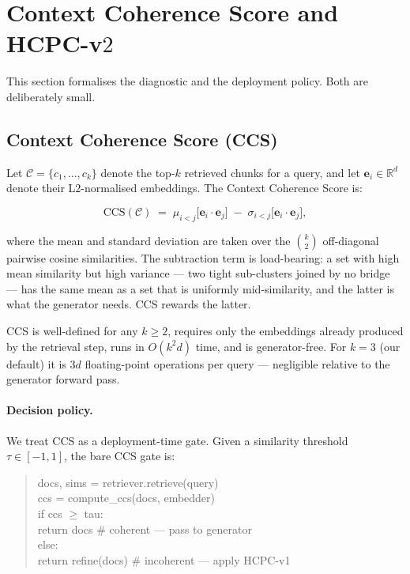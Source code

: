 \section{Context Coherence Score and HCPC-v$2$}
\label{sec:method}

This section formalises the diagnostic and the deployment policy.
Both are deliberately small.

\subsection{Context Coherence Score (CCS)}
\label{sec:method:ccs}

Let $\mathcal{C} = \{c_1, \ldots, c_k\}$ denote the top-$k$ retrieved
chunks for a query, and let $\mathbf{e}_i \in \mathbb{R}^d$ denote
their L$2$-normalised embeddings. The Context Coherence Score is:

\begin{equation}
\textrm{CCS}(\mathcal{C}) \;=\;
  \mu_{i<j}\!\bigl[\mathbf{e}_i \cdot \mathbf{e}_j\bigr]
  \;-\;
  \sigma_{i<j}\!\bigl[\mathbf{e}_i \cdot \mathbf{e}_j\bigr],
\end{equation}

where the mean and standard deviation are taken over the $\binom{k}{2}$
off-diagonal pairwise cosine similarities. The subtraction term is
load-bearing: a set with high mean similarity but high variance --- two
tight sub-clusters joined by no bridge --- has the same mean as a set
that is uniformly mid-similarity, and the latter is what the generator
needs. CCS rewards the latter.

CCS is well-defined for any $k \geq 2$, requires only the embeddings
already produced by the retrieval step, runs in $O(k^2 d)$ time,
and is generator-free. For $k = 3$ (our default) it is $3 d$
floating-point operations per query --- negligible relative to the
generator forward pass.

\paragraph{Decision policy.}
We treat CCS as a deployment-time gate. Given a similarity threshold
$\tau \in [-1, 1]$, the bare CCS gate is:

\begin{quote}\small\ttfamily
docs, sims = retriever.retrieve(query)\\
ccs = compute\_ccs(docs, embedder)\\
if ccs $\geq$ tau:\\
\hspace*{2em}return docs                       \# coherent — pass to generator\\
else:\\
\hspace*{2em}return refine(docs)               \# incoherent — apply HCPC-v1
\end{quote}

